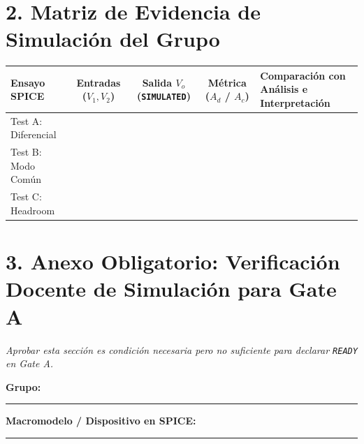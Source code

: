 \documentclass[11pt, a4paper]{article}
\begin{document}
\section*{2. Matriz de Evidencia de Simulación del Grupo}
\begin{table}[htbp]
    \centering
    \footnotesize
    \renewcommand{\arraystretch}{1.45}
    \begin{tabularx}{\textwidth}{|>{\raggedright\arraybackslash}p{3.2cm}|c|c|c|>{\raggedright\arraybackslash}X|}
    \hline
    \rowcolor[HTML]{EFEFEF} 
    \textbf{Ensayo SPICE} & \textbf{Entradas ($V_1, V_2$)} & \textbf{Salida $V_o$ (\texttt{SIMULATED})} & \textbf{Métrica ($A_d$ / $A_c$)} & \textbf{Comparación con Análisis e Interpretación} \\ \hline
    Test A: Diferencial & & & & \\ \hline
    Test B: Modo Común & & & & \\ \hline
    Test C: Headroom & & & & \\ \hline
    \end{tabularx}
\end{table}

\section*{3. Anexo Obligatorio: Verificación Docente de Simulación para Gate A}
\textit{Aprobar esta sección es condición necesaria pero no suficiente para declarar \texttt{READY} en Gate A.}

\vspace{0.2cm}
\noindent\textbf{Grupo:} \rule{3.5cm}{0.4pt} \hfill \textbf{Macromodelo / Dispositivo en SPICE:} \rule{5.5cm}{0.4pt}
\end{document}
